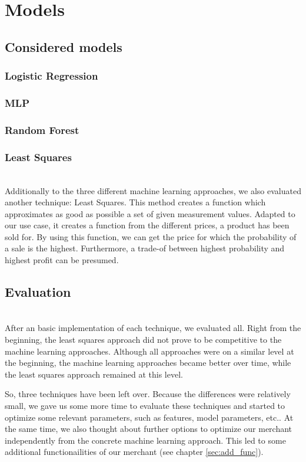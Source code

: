 \section{Models}
\subsection{Considered models}
\subsubsection{Logistic Regression}
\subsubsection{MLP}
\subsubsection{Random Forest}
\subsubsection{Least Squares}
	~\\
	Additionally to the three different machine learning approaches, we also evaluated another technique: Least Squares. This method creates a function which approximates as good as possible a set of given measurement values. Adapted to our use case, it creates a function from the different prices, a product has been sold for. By using this function, we can get the price for which the probability of a sale is the highest. Furthermore, a trade-of between highest probability and highest profit can be presumed.
\subsection{Evaluation}
	~\\
	After an basic implementation of each technique, we evaluated all. Right from the beginning, the least squares approach did not prove to be competitive to the machine learning approaches. Although all approaches were on a similar level at the beginning, the machine learning approaches became better over time, while the least squares approach remained at this level.

	So, three techniques have been left over. Because the differences were relatively small, we gave us some more time to evaluate these techniques and started to optimize some relevant parameters, such as features, model parameters, etc.. At the same time, we also thought about further options to optimize our merchant independently from the concrete machine learning approach. This led to some additional functionailities of our merchant (see chapter \ref{sec:add_func}).
